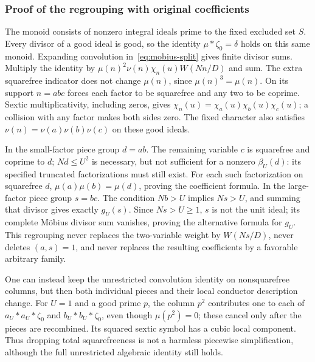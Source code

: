 \documentclass[11pt,oneside,openany]{book}
\theoremstyle{definition}\newtheorem{definition}[theorem]{Definition}
\theoremstyle{remark}\newtheorem{remark}[theorem]{Remark}
\begin{document}
\subsubsection{Proof of the regrouping with original coefficients}
The monoid consists of nonzero integral ideals prime to the fixed excluded
set $S$. Every divisor of a good ideal is good, so the identity
$\mu*\zeta_0=\delta$ holds on this same monoid. Expanding convolution
in~\eqref{eq:mobius-split} gives finite divisor sums. Multiply the identity
by $\mu(n)^2\nu(n)\chi_n(u)W(Nn/D)$ and sum. The extra squarefree
indicator does not change $\mu(n)$, since $\mu(n)^3=\mu(n)$.
On its support $n=abc$ forces each factor to be squarefree and any two
to be coprime. Sextic multiplicativity, including zeros, gives
$\chi_n(u)=\chi_a(u)\chi_b(u)\chi_c(u)$; a collision with any factor
makes both sides zero. The fixed character also satisfies
$\nu(n)=\nu(a)\nu(b)\nu(c)$ on these good ideals.

In the small-factor piece group $d=ab$. The remaining variable $c$ is
squarefree and coprime to $d$; $Nd\le U^2$ is necessary, but not sufficient
for a nonzero $\beta_U(d)$: its specified truncated factorizations must
still exist. For each such factorization on squarefree $d$,
$\mu(a)\mu(b)=\mu(d)$, proving the coefficient formula.
In the large-factor piece group $s=bc$. The condition $Nb>U$ implies
$Ns>U$, and summing that divisor gives exactly $g_U(s)$.
Since $Ns>U\ge1$, $s$ is not the unit ideal; its complete M\"obius
divisor sum vanishes, proving the alternative formula for $g_U$.
This regrouping never replaces the two-variable weight by $W(Ns/D)$,
never deletes $(a,s)=1$, and never replaces the resulting coefficients
by a favorable arbitrary family.

One can instead keep the unrestricted convolution identity on nonsquarefree
columns, but then both individual pieces and their local conductor
description change. For $U=1$ and a good prime $p$, the column $p^2$
contributes one to each of $a_U*a_U*\zeta_0$ and
$b_U*b_U*\zeta_0$, even though $\mu(p^2)=0$; these cancel only after
the pieces are recombined. Its squared sextic symbol has a cubic local
component. Thus dropping total squarefreeness is not a harmless
piecewise simplification, although the full unrestricted algebraic
identity still holds.
\end{document}
